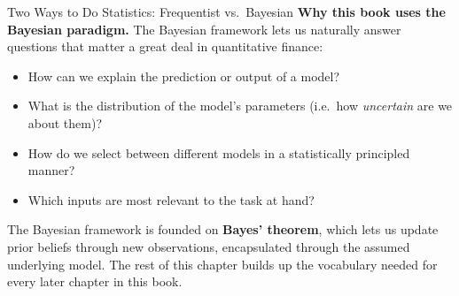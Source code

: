 \documentclass[aspectratio=169,10pt]{beamer}
\begin{document}
\begin{frame}[allowframebreaks]{Two Ways to Do Statistics: Frequentist vs.\ Bayesian}
  \textbf{Why this book uses the Bayesian paradigm.} The Bayesian framework
  lets us naturally answer questions that matter a great deal in
  quantitative finance:
  \begin{itemize}
    \item How can we explain the prediction or output of a model?
    \item What is the distribution of the model's parameters (i.e.\ how
      \emph{uncertain} are we about them)?
    \item How do we select between different models in a statistically
      principled manner?
    \item Which inputs are most relevant to the task at hand?
  \end{itemize}
  The Bayesian framework is founded on \textbf{Bayes' theorem}, which lets us
  update prior beliefs through new observations, encapsulated through the
  assumed underlying model. The rest of this chapter builds up the
  vocabulary needed for every later chapter in this book.
\end{frame}
\end{document}
